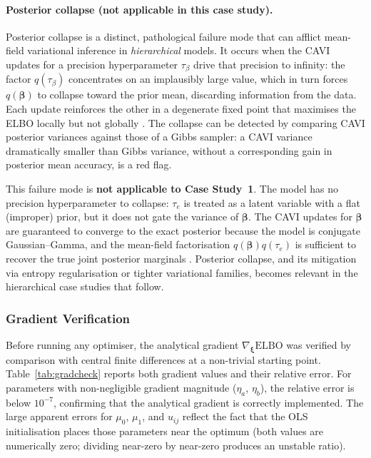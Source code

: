 \documentclass[11pt,a4paper]{article}
\newcommand{\ELBO}{\text{ELBO}}
\begin{document}
\paragraph{Posterior collapse (not applicable in this case study).}
Posterior collapse is a distinct, pathological failure mode that can afflict
mean-field variational inference in \emph{hierarchical} models.
It occurs when the CAVI updates for a precision hyperparameter $\tau_\beta$ drive
that precision to infinity: the factor $q(\tau_\beta)$ concentrates on an
implausibly large value, which in turn forces $q(\bm{\beta})$ to collapse toward
the prior mean, discarding information from the data.
Each update reinforces the other in a degenerate fixed point that maximises the ELBO
locally but not globally \citep{turner2011two}.
The collapse can be detected by comparing CAVI posterior variances against those of a
Gibbs sampler: a CAVI variance dramatically smaller than Gibbs variance, without a
corresponding gain in posterior mean accuracy, is a red flag.

This failure mode is \textbf{not applicable to Case Study~1}.
The model has no precision hyperparameter to collapse: $\tau_e$ is treated as a
latent variable with a flat (improper) prior, but it does not gate the variance of
$\bm{\beta}$.
The CAVI updates for $\bm{\beta}$ are guaranteed to converge to the exact
posterior because the model is conjugate Gaussian--Gamma, and the mean-field
factorisation $q(\bm{\beta})q(\tau_e)$ is sufficient to recover the true joint
posterior marginals \citep{bishop2006pattern}.
Posterior collapse, and its mitigation via entropy regularisation or tighter
variational families, becomes relevant in the hierarchical case studies that follow.

\subsubsection{Gradient Verification}

Before running any optimiser, the analytical gradient $\nabla_{\bm{\xi}}\ELBO$ was
verified by comparison with central finite differences at a non-trivial starting point.
Table~\ref{tab:gradcheck} reports both gradient values and their relative error.
For parameters with non-negligible gradient magnitude ($\eta_a$, $\eta_b$), the relative
error is below $10^{-7}$, confirming that the analytical gradient is correctly implemented.
The large apparent errors for $\mu_0$, $\mu_1$, and $u_{ij}$ reflect the fact that
the OLS initialisation places those parameters near the optimum (both values are
numerically zero; dividing near-zero by near-zero produces an unstable ratio).
\end{document}
